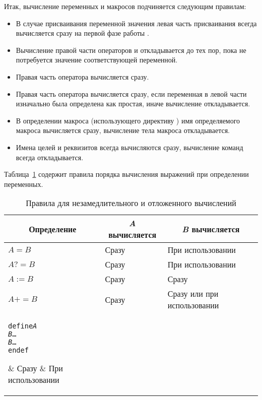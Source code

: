 Итак, вычисление переменных и макросов \GNUmake{} подчиняется
следующим правилам:
\begin{itemize}
\item
В случае присваивания переменной значения левая часть присваивания
всегда вычисляется сразу на первой фазе работы \GNUmake{}.
\item Вычисление правой части операторов \command{=} и 
откладывается до тех пор, пока не потребуется значение соответствующей
переменной.
\item Правая часть оператора \command{:=} вычисляется сразу.
\item Правая часть оператора \command{+=} вычисляется сразу, если
переменная в левой части изначально была определена как простая, иначе
вычисление откладывается.
\item В определении макроса (использующего директиву
) имя определяемого макроса вычисляется сразу,
вычисление тела макроса откладывается.
\item Имена целей и реквизитов всегда вычисляются сразу, вычисление
команд всегда откладывается.
\end{itemize}

Таблица~\ref{tab:rules_for_imm_and_der_exp} содержит правила порядка
вычисления выражений при определении переменных.

\begin{table}
\begin{tabular}{|l|l|l|}
\hline
\multicolumn{1}{|c|}{\textbf{Определение}} &
\multicolumn{1}{c}{\textbf{\emph{A} вычисляется}} &
\multicolumn{1}{|c|}{\textbf{\emph{B} вычисляется}} \\
\hline
\(A = B\) & Сразу & При использовании \\
\hline
\(A ?= B\) & Сразу & При использовании\\
\hline
\(A := B\) & Сразу & Сразу \\
\hline
\(A += B\) & Сразу & Сразу или при использовании\\
\hline
\parbox{2.3cm}{
\begin{alltt}
define \emph{A}\\
\emph{B} \ldots\\
\emph{B} \ldots\\
endef
\end{alltt}
}
& Сразу & При использовании \\
\hline
\end{tabular}
\caption{Правила для незамедлительного и отложенного вычислений}
\label{tab:rules_for_imm_and_der_exp}
\end{table}

